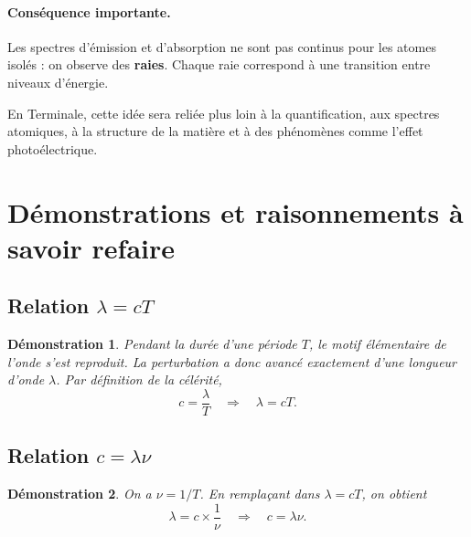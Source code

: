 \documentclass[11pt,a4paper]{article}
\newtheorem*{demonstration}{Démonstration}
\begin{document}
\begin{center}
\end{center}

\paragraph{Conséquence importante.}
Les spectres d'émission et d'absorption ne sont pas continus pour les atomes isolés : on observe des \textbf{raies}. Chaque raie correspond à une transition entre niveaux d'énergie.

\begin{ouverture}
En Terminale, cette idée sera reliée plus loin à la quantification, aux spectres atomiques, à la structure de la matière et à des phénomènes comme l'effet photoélectrique.
\end{ouverture}

\section{Démonstrations et raisonnements à savoir refaire}

\subsection{Relation $\lambda=cT$}
\begin{demonstration}
Pendant la durée d'une période $T$, le motif élémentaire de l'onde s'est reproduit. La perturbation a donc avancé exactement d'une longueur d'onde $\lambda$. Par définition de la célérité,
\[
c=\frac{\lambda}{T} \quad \Longrightarrow \quad \lambda=cT.
\]
\end{demonstration}

\subsection{Relation $c=\lambda\nu$}
\begin{demonstration}
On a $\nu=1/T$. En remplaçant dans $\lambda=cT$, on obtient
\[
\lambda=c\times \frac{1}{\nu}
\quad \Longrightarrow \quad c=\lambda\nu.
\]
\end{demonstration}
\end{document}
